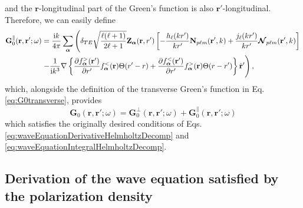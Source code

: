 \documentclass{article}
\begin{document}
and the $\mathbf{r}$-longitudinal part of the Green's function is also $\mathbf{r}'$-longitudinal. Therefore, we can easily define
\begin{equation}\label{eq:G0longitudinal}
\begin{split}
\mathbf{G}_0^\parallel(\mathbf{r},\mathbf{r}';\omega) &= \frac{\mathrm{i}k}{4\pi}\sum_{\bm{\alpha}}\left(\delta_{TE}\sqrt{\frac{\ell(\ell + 1)}{2\ell + 1}}\mathbf{Z}_{\bm{\alpha}}(\mathbf{r},r')\left[-\frac{h_\ell(kr')}{kr'}\mathbf{N}_{p\ell m}(\mathbf{r}',k) + \frac{j_\ell(kr')}{kr'}\bm{\mathcal{N}}_{p\ell m}(\mathbf{r}',k)\right]\right.\\
&\left. -\frac{1}{\mathrm{i} k^3}\nabla\left\{\frac{\partial f_{\bm{\alpha}}^>(\mathbf{r}')}{\partial r'}f_{\bm{\alpha}}^<(\mathbf{r})\Theta(r' - r) + \frac{\partial f_{\bm{\alpha}}^<(\mathbf{r}')}{\partial r'}f_{\bm{\alpha}}^>(\mathbf{r})\Theta(r - r')\right\}\hat{\mathbf{r}}' \vphantom{\sqrt{\frac{\ell(\ell + 1)}{2\ell + 1}}} \right),
\end{split}
\end{equation}
which, alongside the definition of the transverse Green's function in Eq. \eqref{eq:G0transverse}, provides
\begin{equation}
\mathbf{G}_0(\mathbf{r},\mathbf{r}';\omega) = \mathbf{G}_0^\perp(\mathbf{r},\mathbf{r}';\omega) + \mathbf{G}_0^\parallel(\mathbf{r},\mathbf{r}';\omega)
\end{equation}
which satisfies the originally desired conditions of Eqs. \eqref{eq:waveEquationDerivativeHelmholtzDecomp} and \eqref{eq:waveEquationIntegralHelmholtzDecomp}.










\subsection{Derivation of the wave equation satisfied by the polarization density}\label{app:polarizationWaveEquation}
\end{document}
